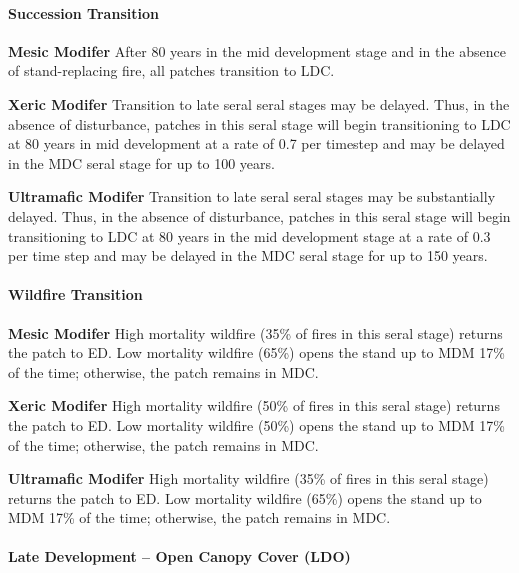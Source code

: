 \paragraph{Succession Transition}
\begin{adjustwidth}{2cm}{}
\textbf{Mesic Modifer } After 80 years in the mid development stage and in the absence of stand-replacing fire, all patches transition to LDC.

\textbf{Xeric Modifer}  Transition to late seral seral stages may be delayed. Thus, in the absence of disturbance, patches in this seral stage will begin transitioning to LDC at 80 years in mid development at a rate of 0.7 per timestep and may be delayed in the MDC seral stage for up to 100 years.

\textbf{Ultramafic Modifer} Transition to late seral seral stages may be substantially delayed. Thus, in the absence of disturbance, patches in this seral stage will begin transitioning to LDC at 80 years in the mid development stage at a rate of 0.3 per time step and may be delayed in the MDC seral stage for up to 150 years.

\end{adjustwidth}

\paragraph{Wildfire Transition}
\begin{adjustwidth}{2cm}{}
\textbf{Mesic Modifer } High mortality wildfire (35\% of fires in this seral stage) returns the patch to ED. Low mortality wildfire (65\%) opens the stand up to MDM 17\% of the time; otherwise, the patch remains in MDC. 

\textbf{Xeric Modifer} High mortality wildfire (50\% of fires in this seral stage) returns the patch to ED. Low mortality wildfire (50\%) opens the stand up to MDM 17\% of the time; otherwise, the patch remains in MDC.

\textbf{Ultramafic Modifer} High mortality wildfire (35\% of fires in this seral stage) returns the patch to ED. Low mortality wildfire (65\%) opens the stand up to MDM 17\% of the time; otherwise, the patch remains in MDC.

\end{adjustwidth}

\noindent\hrulefill


\paragraph{Late Development – Open Canopy Cover (LDO)}

